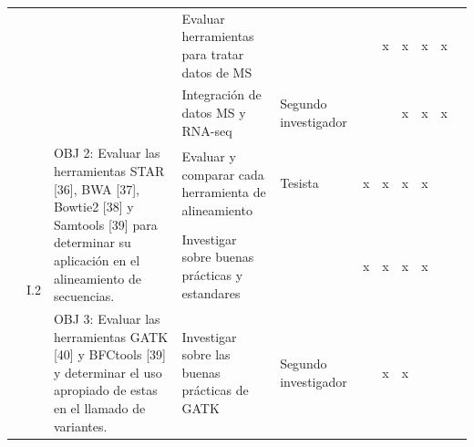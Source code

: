 \documentclass[a4paper,11pt]{article}
\begin{document}
\begin{table}[H]
\begin{tabular}{p{0.6cm}p{0.6cm}p{6cm}p{4cm}p{1cm}cccccc}
		&                       &                                                                                                                                                                                                                                                                                            & Evaluar herramientas para tratar datos de MS                                                         &                    &                       & \multicolumn{1}{c}{x}  & x                    & x                    & \multicolumn{1}{c}{x} &                        \\
		&                       &                                                                                                                                                                                                                                                                                            & Integración de datos  MS y RNA-seq                                                                   & Segundo investigador               &                       &                        & x                    & x                    & \multicolumn{1}{c}{x} &                        \\ 
		& \multirow{5}{*}{I.2}  & \multirow{2}{6cm}{OBJ 2: Evaluar las herramientas STAR {[}36{]}, BWA {[}37{]}, Bowtie2 {[}38{]} y Samtools {[}39{]} para determinar su aplicación en el alineamiento de secuencias.}                                                                                                      & Evaluar y comparar cada herramienta de alineamiento                                                  & Tesista            & \multicolumn{1}{c}{x} & \multicolumn{1}{c}{x}  & x                    & x                    &                       &                        \\
		
		&                       &                                                                                                                                                                                                                                                                                            & Investigar sobre buenas prácticas y estandares                                                       &                    & \multicolumn{1}{c}{x} & \multicolumn{1}{c}{x}  & x                    & x                    &                       &                        \\
		&                       & \multirow{3}{6cm}{OBJ 3: Evaluar las herramientas GATK {[}40{]} y BFCtools {[}39{]} y determinar el uso apropiado de estas en el llamado de variantes.}                                                                                                                                   & Investigar sobre las buenas prácticas de GATK                                                        & Segundo investigador              &                       & \multicolumn{1}{c}{x}  & x                    & \multicolumn{1}{l}{} &                       &                        \\
		

\end{tabular}
\end{table}
\end{document}
